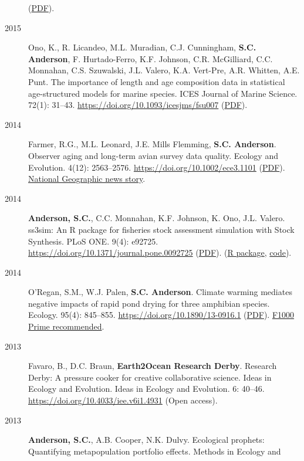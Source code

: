 \begin{description}
(\href{http://icesjms.oxfordjournals.org/content/early/2014/04/09/icesjms.fsu055.full.pdf?keytype=ref\&ijkey=NEXmZIkz3289u3z}{PDF}).
\item[2015]
Ono, K., R. Licandeo, M.L. Muradian, C.J. Cunningham, \textbf{S.C.
Anderson}, F. Hurtado-Ferro, K.F. Johnson, C.R. McGilliard, C.C.
Monnahan, C.S. Szuwalski, J.L. Valero, K.A. Vert-Pre, A.R. Whitten, A.E.
Punt. The importance of length and age composition data in statistical
age-structured models for marine species. ICES Journal of Marine
Science. 72(1): 31--43. \url{https://doi.org/10.1093/icesjms/fsu007}
(\href{http://icesjms.oxfordjournals.org/content/early/2014/02/20/icesjms.fsu007.full.pdf}{PDF}).
\item[2014]
Farmer, R.G., M.L. Leonard, J.E. Mills Flemming, \textbf{S.C. Anderson}.
Observer aging and long-term avian survey data quality. Ecology and
Evolution. 4(12): 2563--2576. \url{https://doi.org/10.1002/ece3.1101}
(\href{http://onlinelibrary.wiley.com/doi/10.1002/ece3.1101/pdf}{PDF}).
\href{http://news.nationalgeographic.com/news/2014/08/140805-aging-birders-breeding-bird-survey-volunteers-science/}{National
Geographic news story}.
\item[2014]
\textbf{Anderson, S.C.}, C.C. Monnahan, K.F. Johnson, K. Ono, J.L.
Valero. ss3sim: An R package for fisheries stock assessment simulation
with Stock Synthesis. PLoS ONE. 9(4): e92725.
\url{https://doi.org/10.1371/journal.pone.0092725}
(\href{http://www.plosone.org/article/fetchObject.action?uri=info\%3Adoi\%2F10.1371\%2Fjournal.pone.0092725\&representation=PDF}{PDF}).
(\href{http://cran.r-project.org/web/packages/ss3sim/index.html}{R
package}, \href{https://github.com/ss3sim/ss3sim}{code}).
\item[2014]
O'Regan, S.M., W.J. Palen, \textbf{S.C. Anderson}. Climate warming
mediates negative impacts of rapid pond drying for three amphibian
species. Ecology. 95(4): 845--855.
\url{https://doi.org/10.1890/13-0916.1}
(\href{http://onlinelibrary.wiley.com/doi/10.1890/13-0916.1/epdf}{PDF}).
\href{https://facultyopinions.com/prime/718498042}{F1000 Prime
recommended}.
\item[2013]
Favaro, B., D.C. Braun, \textbf{Earth2Ocean Research Derby}. Research
Derby: A pressure cooker for creative collaborative science. Ideas in
Ecology and Evolution. Ideas in Ecology and Evolution. 6: 40--46.
\url{https://doi.org/10.4033/iee.v6i1.4931} (Open access).
\item[2013]
\textbf{Anderson, S.C.}, A.B. Cooper, N.K. Dulvy. Ecological prophets:
Quantifying metapopulation portfolio effects. Methods in Ecology and

\end{description}
